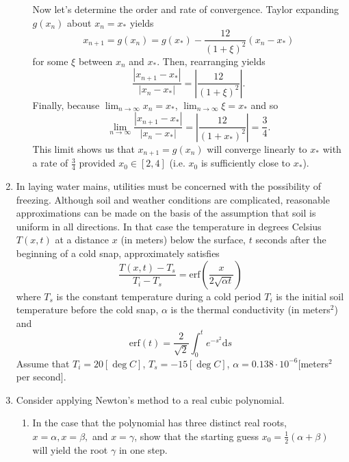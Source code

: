 \documentclass[a4paper,12pt]{article}
\newcommand{\abs}[1]{\left| #1 \right|}
\newcommand{\erf}{\mathrm{erf}}
\newcommand{\dd}{\mathrm{d}}
\begin{document}
\begin{enumerate}[label = \arabic*.]
\begin{enumerate}[label = \roman*.]
			Now let's determine the order and rate of convergence. Taylor expanding $ g(x_n) $ about $ x_n = x_* $ yields
			\[
				x_{n+1} = g(x_n) = g(x_*) - \frac{12}{(1+\xi)^2}(x_n - x_*)
			\]
			for some $ \xi $ between $ x_n $ and $ x_* $. Then, rearranging yields
			\[
				\frac{\abs{x_{n +1} - x_*}}{\abs{x_n - x_*}} = \abs{\frac{12}{(1 + \xi)^2}}.
			\]
			Finally, because $ \lim_{n\to\infty} x_n = x_*$, $  $$\lim_{n\to\infty} \xi = x_*$ and so
			\[
				\lim_{n \to \infty} \frac{\abs{x_{n +1} - x_*}}{\abs{x_n - x_*}} = \abs{\frac{12}{(1 + x_*)^2}} = \frac{3}{4}.
			\]
			This limit shows us that $ x_{n+1} = g(x_n) $ will converge linearly to $ x_* $ with a rate of $ \frac{3}{4} $ provided $ x_0 \in [2,4] $ (i.e. $ x_0 $ is sufficiently close to $ x_* $).
		\end{enumerate}
	
		\item In laying water mains, utilities must be concerned with the possibility of freezing. Although soil and weather conditions are complicated, reasonable approximations can be made on the basis of the assumption that soil is uniform in all directions.  In that case the temperature in degrees Celsius $ T(x,t) $ at a distance $ x $ (in meters) below the surface, $ t $ seconds after the beginning of a cold snap, approximately satisfies
		\[
			\frac{T(x,t) - T_s}{T_i - T_s} = \erf\left(\frac{x}{2\sqrt{\alpha t}}\right)
		\]
		where $ T_s $ is the constant temperature during a cold period $ T_i $ is the initial soil temperature before the cold snap, $ \alpha $ is the thermal conductivity (in meters$ ^2 $) and 
		\[
			\erf(t) = \frac{2}{\sqrt{2}} \int_0^t e^{-s^2}\dd s
		\]
		Assume that $ T_i = 20 [\deg C]$, $ T_s = -15 [\deg C] $, $ \alpha = 0.138 \cdot 10^{-6} [$meters$ ^2 $ per second$ ] .$
		\item Consider applying Newton's method to a real cubic polynomial.
		\begin{enumerate}[label = \roman*.]
			\item In the case that the polynomial has three distinct real roots, $ x = \alpha, x = \beta, $ and $ x = \gamma $, show that the starting guess $ x_0 = \frac{1}{2} (\alpha + \beta) $ will yield the root $ \gamma $ in one step.
			

\end{enumerate}
\end{enumerate}
\end{document}
